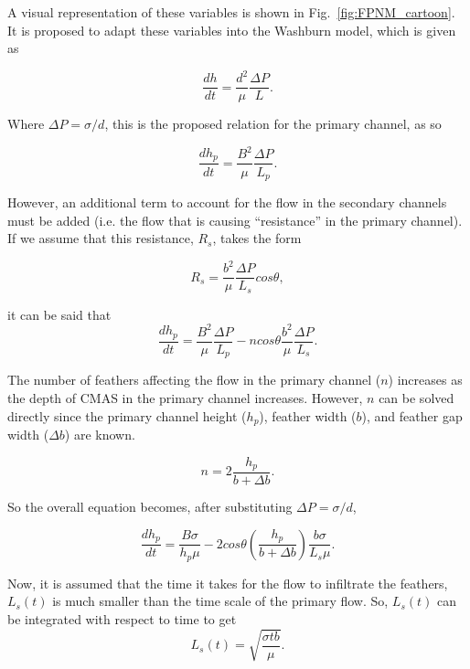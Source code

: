 \documentclass[%
 aip,
 amsmath,amssymb,
 reprint,%
]{revtex4-1}
\begin{document}
\noindent A visual representation of these variables is shown in Fig.~\ref{fig:FPNM_cartoon}. It is proposed to adapt these variables into the Washburn model\cite{Washburn19213}, which is given as

\begin{equation}
    \frac{dh}{dt} = \frac{d^{2}}{\mu}\frac{\Delta P}{L}.
\end{equation}

\noindent Where $\Delta P = \sigma/d$, this is the proposed relation for the primary channel, as so

\begin{equation}
    \frac{dh_{p}}{dt} = \frac{B^{2}}{\mu}\frac{\Delta P}{L_{p}}.
\end{equation}

\noindent However, an additional term to account for the flow in the secondary channels must be added (i.e. the flow that is causing ``resistance'' in the primary channel). If we assume that this resistance, $R_{s}$, takes the form

\begin{equation}
    R_{s} = \frac{b^{2}}{\mu}\frac{\Delta P}{L_{s}}cos\theta,
\end{equation}

\noindent it can be said that 
\begin{equation}
        \frac{dh_{p}}{dt} = \frac{B^{2}}{\mu}\frac{\Delta P}{L_{p}} -ncos\theta\frac{b^{2}}{\mu}\frac{\Delta P}{L_{s}}.
\end{equation}

\noindent The number of feathers affecting the flow in the primary channel ($n$) increases as the depth of CMAS in the primary channel increases. However, $n$ can be solved directly since the primary channel height ($h_p$), feather width ($b$), and feather gap width ($\Delta b$) are known.

\begin{equation}
    n = 2\frac{h_{p}}{b + \Delta b}.
\end{equation}

\noindent So the overall equation becomes, after substituting $\Delta P = \sigma/d$,

\begin{equation}
    \frac{dh_{p}}{dt} = \frac{B \sigma}{h_{p}\mu} - 2 cos\theta\left(\frac{h_{p}}{b + \Delta b} \right)\frac{b \sigma}{L_{s}\mu}.
\end{equation}


\noindent Now, it is assumed that the time it takes for the flow to infiltrate the feathers, $L_{s}(t)$ is much smaller than the time scale of the primary flow. So, $L_{s}(t)$ can be integrated with respect to time to get 
\begin{equation}
    L_{s}\left( t \right) = \sqrt{\frac{\sigma t b}{\mu}}.
\end{equation}
\end{document}
